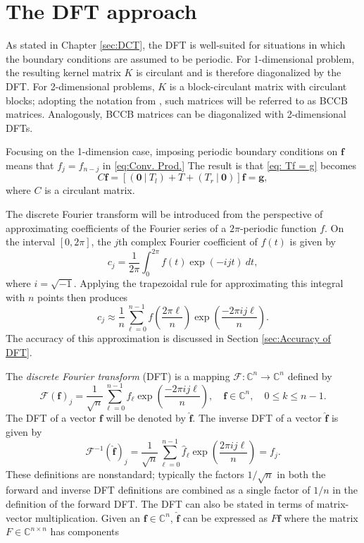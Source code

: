 \documentclass[12pt,notitlepage]{report}
\newcommand{\gVec}{\mathbf{g}}	%
\newcommand{\kMat}{K}	%
\newcommand{\fVec}{\mathbf{f}}	%
\begin{document}
\chapter{The DFT approach} \label{sec:DFT}
As stated in Chapter \ref{sec:DCT}, the DFT is well-suited for situations in which the boundary conditions are assumed to be periodic. For 1-dimensional problem, the resulting kernel matrix $\kMat$ is circulant and is therefore diagonalized by the DFT. For 2-dimensional problems, $\kMat$ is a block-circulant matrix with circulant blocks; adopting the notation from \cite{Vogel:2002}, such matrices will be referred to as BCCB matrices. Analogously, BCCB matrices can be diagonalized with 2-dimensional DFTs. \par 
Focusing on the 1-dimension case, imposing periodic boundary conditions on $\fVec$ means that $f_j = f_{n-j}$ in \eqref{eq:Conv. Prod.} The result is that \eqref{eq: Tf = g} becomes
\[ C\fVec = [(\bm{0} ~|~ T_l) + T + (T_r ~|~ \bm{0})]\fVec = \gVec,\]
where $C$ is a circulant matrix. \par 
The discrete Fourier transform will be introduced from the perspective of approximating coefficients of the Fourier series of a $2\pi$-periodic function $f$. On the interval $[0,2\pi]$, the $j$th complex Fourier coefficient of $f(t)$ is given by
\[c_j = \frac{1}{2\pi}\int_0^{2\pi} f(t)\exp(-ijt)\:dt,\]
where $i = \sqrt{-1}$.  Applying the trapezoidal rule for approximating this integral with $n$ points then produces
\[c_j \approx \frac{1}{n}\sum_{\ell = 0}^{n-1} f\left(\frac{2\pi{\ell}}{n}\right)\exp\left(\frac{-2\pi{ij\ell}}{n}\right).\]
The accuracy of this approximation is discussed in Section \ref{sec:Accuracy of DFT}. \par 
The \textit{discrete Fourier transform} (DFT) is a mapping $\mathcal{F}:\mathbb{C}^n \rightarrow \mathbb{C}^n$ defined by
\begin{equation}
\mathcal{F}(\mathbf{f})_j = \frac{1}{\sqrt{n}}\sum_{\ell=0}^{n-1} f_{\ell}\exp\left(\frac{-2\pi{ij\ell}}{n}\right), \quad \mathbf{f}\in\mathbb{C}^n, \quad 0 \leq k \leq n-1.
\label{eq:DFT}
\end{equation}
The DFT of a vector $\mathbf{f}$ will be denoted by $\widehat{\mathbf{f}}$. The inverse DFT of a vector $\widehat{\mathbf{f}}$ is given by
\begin{equation}
\mathcal{F}^{-1}(\widehat{\mathbf{f}})_j = \frac{1}{\sqrt{n}}\sum_{\ell=0}^{n-1} \widehat{f}_\ell\exp\left(\frac{2\pi{ij\ell}}{n}\right) = f_j.
\end{equation}
These definitions are nonstandard; typically the factors $1/\sqrt{n}$ in both the forward and inverse DFT definitions are combined as a single factor of $1/n$ in the definition of the forward DFT. The DFT can also be stated in terms of matrix-vector multiplication. Given an $\mathbf{f} \in \mathbb{C}^n$, $\widehat{\mathbf{f}}$ can be expressed as $F\mathbf{f}$ where the matrix $F\in\mathbb{C}^{n\times{n}}$ has components
\end{document}
